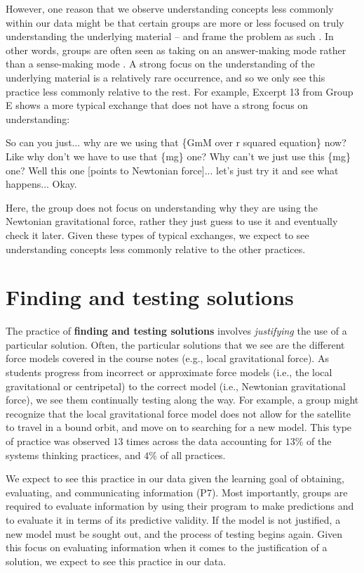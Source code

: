 \documentclass{msuphddissertation}
\begin{document}
\begin{doublespace}
\begin{appendices}
However, one reason that we observe understanding concepts less commonly within our data might be that certain groups are more or less focused on truly understanding the underlying material -- and frame the problem as such \cite{Pugalee2004}.  In other words, groups are often seen as taking on an answer-making mode rather than a sense-making mode \cite{Pawlak2018}.  A strong focus on the understanding of the underlying material is a relatively rare occurrence, and so we only see this practice less commonly relative to the rest.  For example, Excerpt 13 from Group E shows a more typical exchange that does not have a strong focus on understanding: \begin{description}
\SD So can you just... why are we using that \{GmM over r squared equation\} now?
\SD Like why don't we have to use that \{mg\} one?
\SB Why can't we just use this \{mg\} one?
\SC Well this one [points to Newtonian force]... let's just try it and see what happens...
\SD Okay.
\end{description}  Here, the group does not focus on understanding why they are using the Newtonian gravitational force, rather they just guess to use it and eventually check it later.  Given these types of typical exchanges, we expect to see understanding concepts less commonly relative to the other practices.

\section*{Finding and testing solutions}

The practice of \textbf{finding and testing solutions} involves \textit{justifying} the use of a particular solution.  Often, the particular solutions that we see are the different force models covered in the course notes (e.g., local gravitational force).  As students progress from incorrect or approximate force models (i.e., the local gravitational or centripetal) to the correct model (i.e., Newtonian gravitational force), we see them continually testing along the way.  For example, a group might recognize that the local gravitational force model does not allow for the satellite to travel in a bound orbit, and move on to searching for a new model.  This type of practice was observed $13$ times across the data  accounting for $13\%$ of the systems thinking practices, and $4\%$ of all practices.

We expect to see this practice in our data given the learning goal of obtaining, evaluating, and communicating information (P7).  Most importantly, groups are required to evaluate information by using their program to make predictions and to evaluate it in terms of its predictive validity.  If the model is not justified, a new model must be sought out, and the process of testing begins again.  Given this focus on evaluating information when it comes to the justification of a solution, we expect to see this practice in our data.


\end{appendices}
\end{doublespace}
\end{document}
